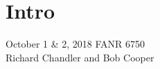 \documentclass[color=usenames,dvipsnames]{beamer}\usepackage[]{graphicx}\usepackage[]{color}
\makeatletter
\newcommand{\hlnum}[1]{\textcolor[rgb]{0.69,0.494,0}{#1}}%
\newcommand{\hlstr}[1]{\textcolor[rgb]{0.749,0.012,0.012}{#1}}%
\newcommand{\hlcom}[1]{\textcolor[rgb]{0.514,0.506,0.514}{\textit{#1}}}%
\newcommand{\hlopt}[1]{\textcolor[rgb]{0,0,0}{#1}}%
\newcommand{\hlstd}[1]{\textcolor[rgb]{0,0,0}{#1}}%
\newcommand{\hlkwb}[1]{\textcolor[rgb]{0,0.341,0.682}{#1}}%
\newcommand{\hlkwc}[1]{\textcolor[rgb]{0,0,0}{\textbf{#1}}}%
\newcommand{\hlkwd}[1]{\textcolor[rgb]{0.004,0.004,0.506}{#1}}%
\newenvironment{kframe}{%
 \def\at@end@of@kframe{}%
 \ifinner\ifhmode%
  \def\at@end@of@kframe{\end{minipage}}%
  \begin{minipage}{\columnwidth}%
 \fi\fi%
 \def\FrameCommand##1{\hskip\@totalleftmargin \hskip-\fboxsep
 \colorbox{shadecolor}{##1}\hskip-\fboxsep
     \hskip-\linewidth \hskip-\@totalleftmargin \hskip\columnwidth}%
 \MakeFramed {\advance\hsize-\width
   \@totalleftmargin\z@ \linewidth\hsize
   \@setminipage}}%
 {\par\unskip\endMakeFramed%
 \at@end@of@kframe}
\newenvironment{knitrout}{}{} %
\makeatother
\begin{document}
\section{Intro}

\begin{frame}[plain]
  \LARGE
  \centering \par
  {\color{RoyalBlue}{\huge Lab 7 -- $A \times B$ Factorial Designs}} \par
  \vspace{1cm}
  \Large
  October 1 \& 2, 2018
  FANR 6750 \\
  \vfill
  \large
  Richard Chandler and Bob Cooper
\end{frame}



\begin{comment}
\begin{frame}[fragile]
  \frametitle{Data}
\begin{knitrout}
\definecolor{shadecolor}{rgb}{0.878, 0.918, 0.933}\color{fgcolor}\begin{kframe}
\begin{alltt}
\hlstd{makeData} \hlkwb{<-} \hlkwd{data.frame}\hlstd{(}\hlkwc{precip}\hlstd{=}\hlkwd{rep}\hlstd{(}\hlkwd{c}\hlstd{(}\hlstr{"Wet"}\hlstd{,} \hlstr{"Dry"}\hlstd{),} \hlkwc{each}\hlstd{=}\hlnum{24}\hlstd{),}
                       \hlkwc{temp}\hlstd{=}\hlkwd{rep}\hlstd{(}\hlkwd{c}\hlstd{(}\hlstr{"Cold"}\hlstd{,} \hlstr{"Hot"}\hlstd{),} \hlkwc{times}\hlstd{=}\hlnum{24}\hlstd{))}
\hlstd{X} \hlkwb{<-} \hlkwd{model.matrix}\hlstd{(}\hlopt{~}\hlstd{precip}\hlopt{*}\hlstd{temp, makeData)} \hlcom{#~forest*season, makeData)}
\hlstd{E} \hlkwb{<-} \hlstd{X} \hlopt{%*%} \hlkwd{c}\hlstd{(}\hlnum{20}\hlstd{,} \hlnum{3}\hlstd{,} \hlopt{-}\hlnum{3}\hlstd{,} \hlopt{-}\hlnum{10}\hlstd{)}
\hlkwd{set.seed}\hlstd{(}\hlnum{3440}\hlstd{)}
\hlstd{species} \hlkwb{<-} \hlkwd{round}\hlstd{(}\hlkwd{rnorm}\hlstd{(}\hlkwd{nrow}\hlstd{(X), E,} \hlkwc{sd}\hlstd{=}\hlnum{2}\hlstd{))}
\hlstd{species}
\end{alltt}
\begin{verbatim}
##  [1] 27  9 23 10 21 12 28  8 23 11 20 10 24 12 21 12 26  8 22 10 21 11 25
## [24]  9 17 18 25 15 15 16 21 22 21 17 20 17 19 18 21 17 19 20 21 18 19 15
## [47] 21 17
\end{verbatim}
\begin{alltt}
\hlstd{richness} \hlkwb{<-} \hlkwd{data.frame}\hlstd{(species, makeData)}
\hlkwd{summary}\hlstd{(}\hlkwd{aov}\hlstd{(species} \hlopt{~} \hlstd{precip}\hlopt{*}\hlstd{temp, richness))}

\end{comment}
\end{document}
